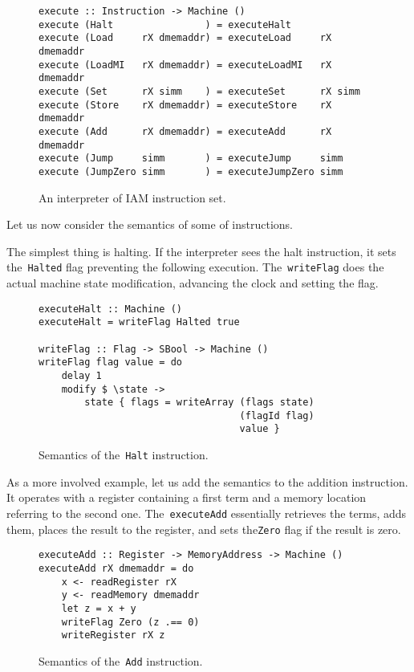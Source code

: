 \begin{figure}[H]
\begin{verbatim}
execute :: Instruction -> Machine ()
execute (Halt                ) = executeHalt
execute (Load     rX dmemaddr) = executeLoad     rX dmemaddr
execute (LoadMI   rX dmemaddr) = executeLoadMI   rX dmemaddr
execute (Set      rX simm    ) = executeSet      rX simm
execute (Store    rX dmemaddr) = executeStore    rX dmemaddr
execute (Add      rX dmemaddr) = executeAdd      rX dmemaddr
execute (Jump     simm       ) = executeJump     simm
execute (JumpZero simm       ) = executeJumpZero simm
\end{verbatim}
\caption{An interpreter of IAM instruction set.}
\label{execute}
\end{figure}

Let us now consider the semantics of some of instructions.

The simplest thing is halting. If the interpreter sees the halt instruction, it
sets the~\texttt{Halted} flag preventing the following execution.
The~\texttt{writeFlag} does the actual machine state modification,
advancing the clock and setting the flag.

\begin{figure}[H]
\begin{verbatim}
executeHalt :: Machine ()
executeHalt = writeFlag Halted true

writeFlag :: Flag -> SBool -> Machine ()
writeFlag flag value = do
    delay 1
    modify $ \state ->
        state { flags = writeArray (flags state)
                                   (flagId flag)
                                   value }
\end{verbatim}
\caption{Semantics of the~\texttt{Halt} instruction.}
\label{haltSemantics}
\end{figure}

As a more involved example, let us add the semantics to the addition instruction.
It operates with a register containing a first term and a memory location referring
to the second one. The~\texttt{executeAdd} essentially retrieves the terms,
adds them, places the result to the register, and sets the\texttt{Zero}
flag if the result is zero.

\begin{figure}[H]
\begin{verbatim}
executeAdd :: Register -> MemoryAddress -> Machine ()
executeAdd rX dmemaddr = do
    x <- readRegister rX
    y <- readMemory dmemaddr
    let z = x + y
    writeFlag Zero (z .== 0)
    writeRegister rX z
\end{verbatim}
\caption{Semantics of the~\texttt{Add} instruction.}
\label{addSemantics}
\end{figure}

